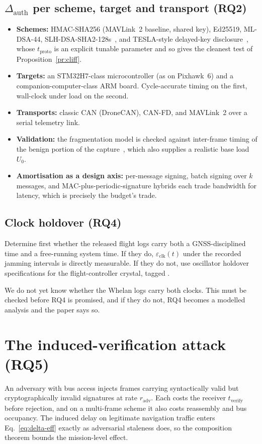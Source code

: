 \documentclass[11pt,a4paper]{article}
\newcommand{\Dauth}{\Delta_{\mathrm{auth}}}
\newcommand{\eclk}{\varepsilon_{\mathrm{clk}}}
\begin{document}
\subsection{$\Dauth$ per scheme, target and transport (RQ2)}
\begin{itemize}
\item \textbf{Schemes:} HMAC-SHA256 (MAVLink~2 baseline, shared key), Ed25519,
  ML-DSA-44, SLH-DSA-SHA2-128s~\cite{nist_pqc}, and TESLA-style delayed-key
  disclosure~\cite{perrig2000tesla}, whose $t_{\mathrm{proto}}$ is an explicit
  tunable parameter and so gives the cleanest test of
  Proposition~\ref{pr:cliff}.
\item \textbf{Targets:} an STM32H7-class microcontroller (as on Pixhawk~6) and a
  companion-computer-class ARM board. Cycle-accurate timing on the first,
  wall-clock under load on the second.
\item \textbf{Transports:} classic CAN (DroneCAN), CAN-FD, and MAVLink~2 over a
  serial telemetry link.
\item \textbf{Validation:} the fragmentation model is checked against inter-frame
  timing of the benign portion of the 
  capture~\cite{hcrl_uavcan}, which also supplies a realistic base load $U_0$.
\item \textbf{Amortisation as a design axis:} per-message signing, batch signing
  over $k$ messages, and MAC-plus-periodic-signature hybrids each trade
  bandwidth for latency, which is precisely the budget's trade.
\end{itemize}

\subsection{Clock holdover (RQ4)}
Determine first whether the released flight logs carry both a GNSS-disciplined
time and a free-running system time. If they do, $\eclk(t)$ under the recorded
jamming intervals is directly measurable. If they do not, use oscillator
holdover specifications for the flight-controller crystal, tagged
.

\begin{honestly}
We do not yet know whether the Whelan logs carry both clocks. This must be
checked before RQ4 is promised, and if they do not, RQ4 becomes a modelled
analysis and the paper says so.
\end{honestly}

\section{The induced-verification attack (RQ5)}
\label{sec:attack}
An adversary with bus access injects frames carrying syntactically valid but
cryptographically invalid signatures at rate $r_{\mathrm{adv}}$. Each costs the
receiver $t_{\mathrm{verify}}$ before rejection, and on a multi-frame scheme it
also costs reassembly and bus occupancy. The induced delay on legitimate
navigation traffic enters Eq.~\eqref{eq:delta-eff} exactly as adversarial
staleness does, so the composition theorem bounds the mission-level effect.
\end{document}
